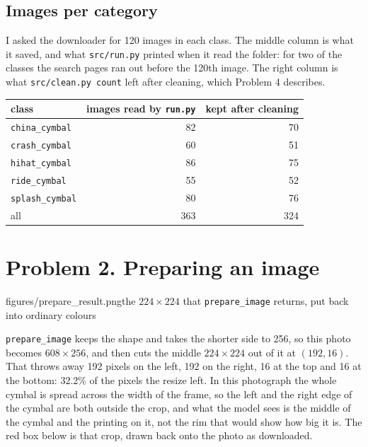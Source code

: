 \documentclass[11pt]{article}
\begin{document}
\subsection*{Images per category}

I asked the downloader for 120 images in each class. The middle column is what
it saved, and what \texttt{src/run.py} printed when it read the folder: for two
of the classes the search pages ran out before the 120th image. The right column
is what \texttt{src/clean.py count} left after cleaning, which Problem 4
describes.

\begin{center}\footnotesize
\begin{tabular}{lrr}
\toprule
class & images read by \texttt{run.py} & kept after cleaning \\
\midrule
\texttt{china\_cymbal}  & 82 & 70 \\
\texttt{crash\_cymbal}  & 60 & 51 \\
\texttt{hihat\_cymbal}  & 86 & 75 \\
\texttt{ride\_cymbal}   & 55 & 52 \\
\texttt{splash\_cymbal} & 80 & 76 \\
\midrule
all                     & 363 & 324 \\
\bottomrule
\end{tabular}
\end{center}

\section*{Problem 2. Preparing an image}

{figures/prepare_result.png}{the $224 \times 224$ that \texttt{prepare\_image}
returns, put back into ordinary colours}

\texttt{prepare\_image} keeps the shape and takes the shorter side to 256, so
this photo becomes $608 \times 256$, and then cuts the middle $224 \times 224$
out of it at $(192, 16)$. That throws away 192 pixels on the left, 192 on the
right, 16 at the top and 16 at the bottom: 32.2\% of the pixels the resize
left. In this photograph the whole cymbal is spread across the width of the
frame, so the left and the right edge of the cymbal are both outside the crop,
and what the model sees is the middle of the cymbal and the printing on it, not
the rim that would show how big it is. The red box below is that crop, drawn
back onto the photo as downloaded.
\end{document}
